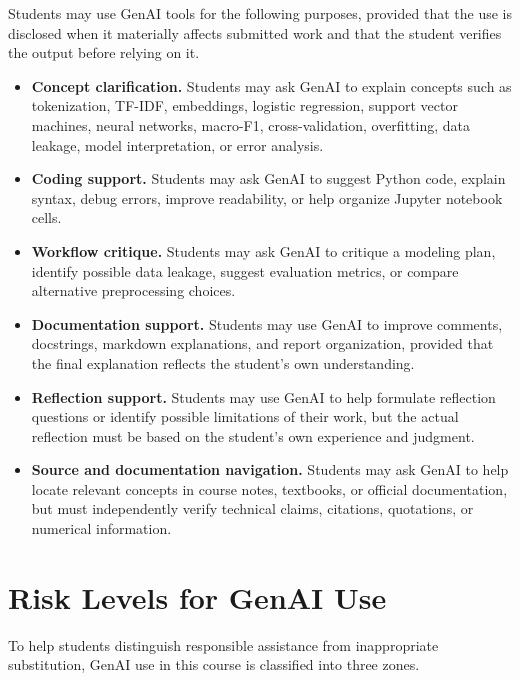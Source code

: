 \documentclass[11pt]{article}
\begin{document}
Students may use GenAI tools for the following purposes, provided that the use is disclosed when it materially affects submitted work and that the student verifies the output before relying on it.

\begin{itemize}
    \item \textbf{Concept clarification.} Students may ask GenAI to explain concepts such as tokenization, TF-IDF, embeddings, logistic regression, support vector machines, neural networks, macro-F1, cross-validation, overfitting, data leakage, model interpretation, or error analysis.
    \item \textbf{Coding support.} Students may ask GenAI to suggest Python code, explain syntax, debug errors, improve readability, or help organize Jupyter notebook cells.
    \item \textbf{Workflow critique.} Students may ask GenAI to critique a modeling plan, identify possible data leakage, suggest evaluation metrics, or compare alternative preprocessing choices.
    \item \textbf{Documentation support.} Students may use GenAI to improve comments, docstrings, markdown explanations, and report organization, provided that the final explanation reflects the student's own understanding.
    \item \textbf{Reflection support.} Students may use GenAI to help formulate reflection questions or identify possible limitations of their work, but the actual reflection must be based on the student's own experience and judgment.
    \item \textbf{Source and documentation navigation.} Students may ask GenAI to help locate relevant concepts in course notes, textbooks, or official documentation, but must independently verify technical claims, citations, quotations, or numerical information.
\end{itemize}

\section{Risk Levels for GenAI Use}

To help students distinguish responsible assistance from inappropriate substitution, GenAI use in this course is classified into three zones.
\end{document}
